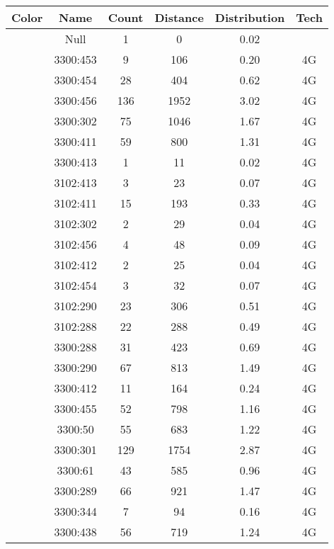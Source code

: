 \begin{longtable*}{|c|c|c|c|c|c|}\hline
{}
Color&Name&Count&Distance&Distribution&Tech\\\hline\hline
{} &Null&1&0&0.02&\\\hline
{} &3300:453&9&106&0.20&4G\\\hline
{} &3300:454&28&404&0.62&4G\\\hline
{} &3300:456&136&1952&3.02&4G\\\hline
{} &3300:302&75&1046&1.67&4G\\\hline
{} &3300:411&59&800&1.31&4G\\\hline
{} &3300:413&1&11&0.02&4G\\\hline
{} &3102:413&3&23&0.07&4G\\\hline
{} &3102:411&15&193&0.33&4G\\\hline
{} &3102:302&2&29&0.04&4G\\\hline
{} &3102:456&4&48&0.09&4G\\\hline
{} &3102:412&2&25&0.04&4G\\\hline
{} &3102:454&3&32&0.07&4G\\\hline
{} &3102:290&23&306&0.51&4G\\\hline
{} &3102:288&22&288&0.49&4G\\\hline
{} &3300:288&31&423&0.69&4G\\\hline
{} &3300:290&67&813&1.49&4G\\\hline
{} &3300:412&11&164&0.24&4G\\\hline
{} &3300:455&52&798&1.16&4G\\\hline
{} &3300:50&55&683&1.22&4G\\\hline
{} &3300:301&129&1754&2.87&4G\\\hline
{} &3300:61&43&585&0.96&4G\\\hline
{} &3300:289&66&921&1.47&4G\\\hline
{} &3300:344&7&94&0.16&4G\\\hline
{} &3300:438&56&719&1.24&4G\\\hline

\end{longtable*}
